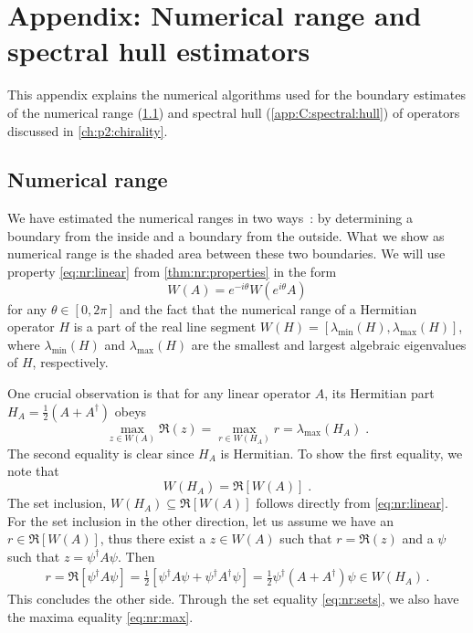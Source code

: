 \chapter{Appendix: Numerical range and spectral hull estimators}
\label{ch:appendix:C}
\label{ch:appendix:nr:ch:estimator}


This appendix explains the numerical algorithms used for the boundary estimates of the numerical range (\cref{app:C:numerical:range}) and spectral hull (\cref{app:C:spectral:hull}) of operators discussed in \cref{ch:p2:chirality}.

\section{Numerical range}
\label{app:C:numerical:range}

We have estimated the numerical ranges in two ways~\cite{johnson1978numerical}: by determining a boundary from the inside and a boundary from the outside.
What we show as numerical range is the shaded area between these two boundaries.
We will use property \cref{eq:nr:linear} from \cref{thm:nr:properties} in the form
\begin{equation} \label{eq:nr:linear:theta}
W(A) = e^{-i \theta} W(e^{i \theta} A)
\end{equation}
for any $\theta \in [0, 2 \pi]$ and the fact that the numerical range of a Hermitian operator $H$ is a part of the real line segment $W(H) = [\lambda_{\text{min}}(H), \lambda_{\text{max}}(H)]$, where $\lambda_{\text{min}}(H)$ and $\lambda_{\text{max}}(H)$ are the smallest and largest algebraic eigenvalues of $H$, respectively.

One crucial observation is that for any linear operator $A$, its Hermitian part $H_A = \frac{1}{2} ( A + A^{\dagger} )$ obeys
\begin{equation} \label{eq:nr:max}
\max_{z \in W(A)} \Re(z) = \max_{r \in W(H_A)} r = \lambda_{\text{max}}(H_A)\;.
\end{equation}
The second equality is clear since $H_A$ is Hermitian.
To show the first equality, we note that
\begin{equation} \label{eq:nr:sets}
W(H_A) = \Re[W(A)] \;.
\end{equation}
The set inclusion, $W(H_A) \subseteq \Re[W(A)]$ follows directly from \cref{eq:nr:linear}.
For the set inclusion in the other direction, let us assume we have an $r \in \Re[W(A)]$, thus there exist a $z \in W(A)$ such that $r = \Re(z)$ and a $\psi$ such that $z = \psi^{\dagger} A \psi$.
Then
\begin{align}
r
= \Re [\psi^{\dagger} A \psi]
= \frac{1}{2} \left[ \psi^{\dagger} A \psi + \psi^{\dagger} A^{\dagger} \psi \right]
= \frac{1}{2} \psi^{\dagger} (A+A^{\dagger}) \psi
\in W(H_A) \,.
\end{align}
This concludes the other side.
Through the set equality \cref{eq:nr:sets}, we also have the maxima equality \cref{eq:nr:max}.

